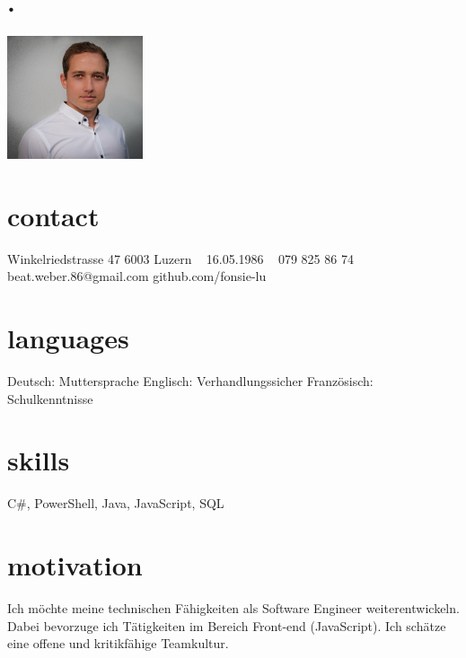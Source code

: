 \documentclass[]{cv-style} %
\begin{document}
\begin{aside}
\section{.}
\includegraphics[width=4cm]{portrait}
\section{contact}
Winkelriedstrasse 47
6003 Luzern
~
16.05.1986
~
079 825 86 74
beat.weber.86@gmail.com
github.com/fonsie-lu
\section{languages}
Deutsch: Muttersprache
Englisch: Verhandlungssicher 
Französisch: Schulkenntnisse
\section{skills}
C\#, PowerShell, Java, JavaScript, SQL
\end{aside}
\section{motivation}
  \vspace{-0.3cm}
Ich möchte meine technischen Fähigkeiten als Software Engineer weiterentwickeln. Dabei bevorzuge ich Tätigkeiten im Bereich Front-end (JavaScript). Ich schätze eine offene und kritikfähige Teamkultur.
\end{document}
